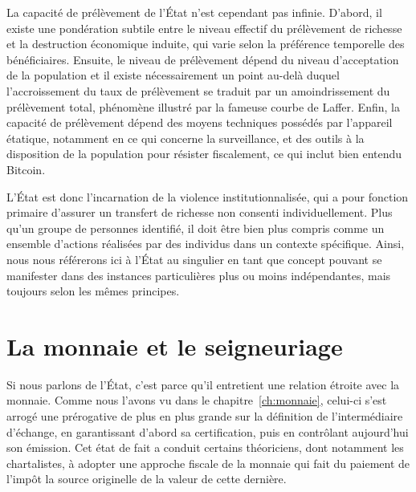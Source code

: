 La capacité de prélèvement de l'État n'est cependant pas infinie. D'abord, il existe une pondération subtile entre le niveau effectif du prélèvement de richesse et la destruction économique induite, qui varie selon la préférence temporelle des bénéficiaires. Ensuite, le niveau de prélèvement dépend du niveau d'acceptation de la population et il existe nécessairement un point au-delà duquel l'accroissement du taux de prélèvement se traduit par un amoindrissement du prélèvement total, phénomène illustré par la fameuse courbe de Laffer. Enfin, la capacité de prélèvement dépend des moyens techniques possédés par l'appareil étatique, notamment en ce qui concerne la surveillance, et des outils à la disposition de la population pour résister fiscalement, ce qui inclut bien entendu Bitcoin.

L'État est donc l'incarnation de la violence institutionnalisée, qui a pour fonction primaire d'assurer un transfert de richesse non consenti individuellement. Plus qu'un groupe de personnes identifié, il doit être bien plus compris comme un ensemble d'actions réalisées par des individus dans un contexte spécifique. Ainsi, nous nous référerons ici à l'État au singulier en tant que concept pouvant se manifester dans des instances particulières plus ou moins indépendantes, mais toujours selon les mêmes principes. %

\section*{La monnaie et le seigneuriage}

Si nous parlons de l'État, c'est parce qu'il entretient une relation étroite avec la monnaie. Comme nous l'avons vu dans le chapitre~\ref{ch:monnaie}, celui-ci s'est arrogé une prérogative de plus en plus grande sur la définition de l'intermédiaire d'échange, en garantissant d'abord sa certification, puis en contrôlant aujourd'hui son émission. Cet état de fait a conduit certains théoriciens, dont notamment les chartalistes, à adopter une approche fiscale de la monnaie qui fait du paiement de l'impôt la source originelle de la valeur de cette dernière.

